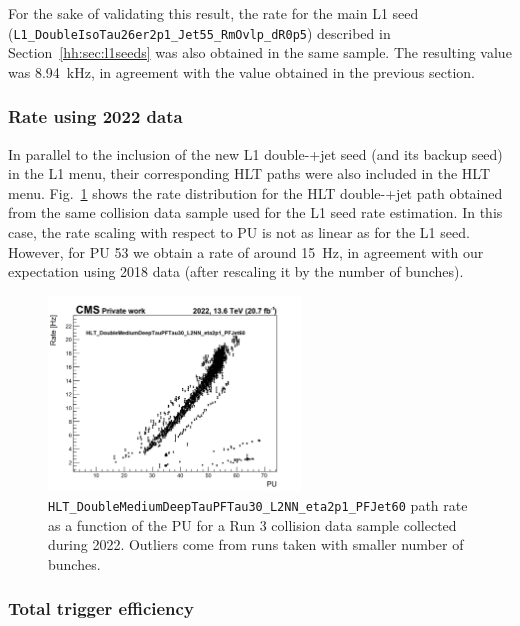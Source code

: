 \documentclass[../main.tex]{subfiles}
\begin{document}
For the sake of validating this result, the rate for the main L1 seed (\texttt{L1\_Double\-IsoTau26er2p1\_Jet55\_RmOvlp\_dR0p5}) described in Section~\ref{hh:sec:l1seeds} was also obtained in the same sample. The resulting value was 8.94~kHz, in agreement with the value obtained in the previous section. 

\subsubsection{Rate using 2022 data}

In parallel to the inclusion of the new L1 double-\tauh{}+jet seed (and its backup seed) in the L1 menu, their corresponding HLT paths were also included in the HLT menu. Fig.~\ref{hh:fig:hlt_rate_run3} shows the rate distribution for the HLT double-\tauh{}+jet path obtained from the same collision data sample used for the L1 seed rate estimation. In this case, the rate scaling with respect to PU is not as linear as for the L1 seed. However, for PU 53 we obtain a rate of around 15~Hz, in agreement with our expectation using 2018 data (after rescaling it by the number of bunches).

\begin{figure}[h!]
\begin{center}
\includegraphics[width=0.6\textwidth]{Images/HLT_rate}
\end{center}
\caption[\texttt{HLT\_Double\-MediumDeepTauPFTau30\_L2NN\_eta2p1\_PFJet60} path rate]{\texttt{HLT\_Double\-MediumDeepTauPFTau30\_L2NN\_eta2p1\_PFJet60} path rate as a function of the PU for a Run 3 collision data sample collected during 2022.  Outliers come from runs taken with smaller number of bunches.}
\label{hh:fig:hlt_rate_run3}
\end{figure}

\subsubsection{Total trigger efficiency}
\end{document}
